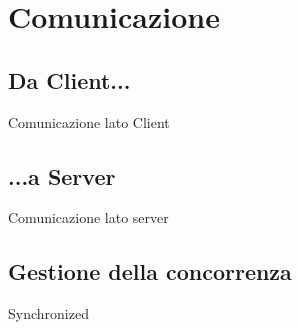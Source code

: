 \documentclass[14pt, aspectratio=169]{beamer}
\begin{document}
\section{Comunicazione}

\subsection{Da Client...}

\begin{frame}{Comunicazione lato Client}
  
\end{frame}

\subsection{...a Server}

\begin{frame}{Comunicazione lato server}
  
\end{frame}

\subsection{Gestione della concorrenza}

\begin{frame}{Synchronized}
  
\end{frame}
\end{document}
